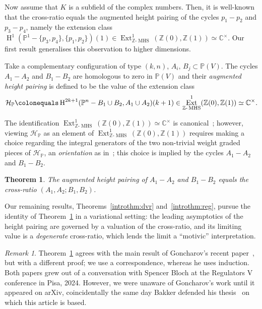 \documentclass[11pt,a4paper]{amsart}
\newcommand{\C}{\mathbb{C}}
\renewcommand{\H}{\operatorname{H}}
\newcommand{\Pp}{\mathbb{P}}
\newcommand{\p}{\mathbb{P}^1}
\newcommand{\pn}{\mathbb{P}^{n}}
\newcommand{\pv}{\mathbb{P}(V)}
\newcommand{\Z}{\mathbb{Z}}
\DeclareMathOperator{\Ext}{Ext}
\theoremstyle{plain}
\newtheorem{introtheorem}{Theorem}       %
\theoremstyle{definition}
\theoremstyle{remark}
\newtheorem{remark}[theorem]{Remark}
\DeclareMathOperator{\MHS}{MHS}
\newcommand{\ZMHS}{\Z\text{-}\MHS}
\newcommand{\ch}{\mathcal{H}}
\newcommand{\coleq}{\colonequals}
\begin{document}
\medskip

Now assume that $K$ is a subfield of the complex numbers. Then, it is well-known that the cross-ratio equals the augmented height pairing of the cycles $p_1-p_2$ and $p_3-p_4$, namely the extension class $\H^1(\p -\{p_3,p_4\},\{p_1,p_2\})(1) \in \Ext^1_{\ZMHS}(\Z(0),\Z(1)) \simeq \C^\times$.
Our first result generalises this observation to higher dimensions.

Take a complementary configuration of type $(k,n)$, $A_i,\, B_j\subset \pv$.
The cycles $A_1-A_2$ and $B_1-B_2$ are homologous to zero in $\pv$ and their \emph{augmented height pairing} is defined to be the value of the extension class 
\begin{equation}\label{eq:hp}
    \ch_\Pp \coleq \H^{2k+1}(\pn  -  B_1\cup B_2 , A_1\cup A_2)(k+1) \in \Ext^1_{\ZMHS}(\Z(0),\Z(1)) \simeq \C^\times.
\end{equation}

The identification $\Ext^1_{\ZMHS}(\Z(0),\Z(1)) \simeq \C^\times$ is canonical~\cite{Carlson1980}; however, viewing $\ch_\Pp$ as an element of $\Ext^1_{\ZMHS}(\Z(0),\Z(1))$ requires making a choice regarding the integral generators of the two non-trivial weight graded pieces of $\ch_\Pp$, an \emph{orientation} as in~\cite[Definition~2.3]{BurgosGilGoswamiPearlstein2022}; this choice is implied by the cycles $A_1-A_2$ and $B_1-B_2$. 

\begin{introtheorem}
\label{introthm:aug_height_is_cross}
    The augmented height pairing of $A_1-A_2$ and $B_1-B_2$ equals the cross-ratio $(A_1,A_2;B_1,B_2)$.
\end{introtheorem}

Our remaining results, Theorems~\ref{introthm:dvr} and~\ref{introthm:reg}, pursue the identity of Theorem~\ref{introthm:aug_height_is_cross} in a variational setting: the leading asymptotics of the height pairing are governed by a valuation of the cross-ratio, and its limiting value is a \emph{degenerate} cross-ratio, which lends the limit a ``motivic'' interpretation.

\begin{remark}
Theorem~\ref{introthm:aug_height_is_cross} agrees with the main result of Goncharov's recent paper~\cite{Goncharov2026}, but with a different proof; we use a correspondence, whereas he uses induction. Both papers grew out of a conversation with Spencer Bloch at the Regulators V conference in Pisa, 2024. However, we were unaware of Goncharov's work until it appeared on arXiv, coincidentally the same day Bakker defended his thesis~\cite{Bakker2026} on which this article is based.
\end{remark}
\end{document}
